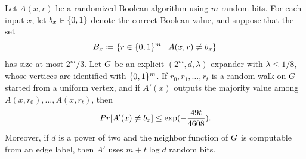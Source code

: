 \begin{theorem}
	\label{thm:expander-walk-error-reduction}
	Let \(A(x,r)\) be a randomized Boolean algorithm using \(m\) random bits. For each input \(x\), let \(b_x\in\{0,1\}\) denote the correct Boolean value, and suppose that the set
	\begin{equation}
		B_x\coloneqq \{r\in\{0,1\}^m\mid A(x,r)\neq b_x\}
	\end{equation}
	has size at most \(2^m/3\). Let \(G\) be an explicit \((2^m,d,\lambda)\)-expander with \(\lambda\leq 1/8\), whose vertices are identified with \(\{0,1\}^m\). If \(r_0,r_1,\ldots,r_t\) is a random walk on \(G\) started from a uniform vertex, and if \(A'(x)\) outputs the majority value among \(A(x,r_0),\ldots,A(x,r_t)\), then
	\begin{equation}
		\Prob[A'(x)\neq b_x]\leq \exp\left(-\frac{49t}{4608}\right).
	\end{equation}
	Moreover, if \(d\) is a power of two and the neighbor function of \(G\) is computable from an edge label, then \(A'\) uses \(m+t\log d\) random bits.
\end{theorem}


